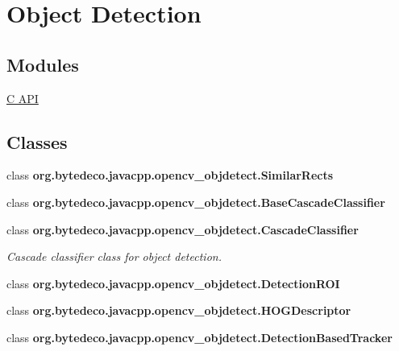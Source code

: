 \hypertarget{group__objdetect}{}\section{Object Detection}
\label{group__objdetect}
\subsection*{Modules}
\begin{DoxyCompactItemize}
\item 
\hyperlink{group__objdetect__c}{C A\+PI}
\end{DoxyCompactItemize}
\subsection*{Classes}
\begin{DoxyCompactItemize}
\item 
class {\bfseries org.\+bytedeco.\+javacpp.\+opencv\+\_\+objdetect.\+Similar\+Rects}
\item 
class {\bfseries org.\+bytedeco.\+javacpp.\+opencv\+\_\+objdetect.\+Base\+Cascade\+Classifier}
\item 
class {\bfseries org.\+bytedeco.\+javacpp.\+opencv\+\_\+objdetect.\+Cascade\+Classifier}
\begin{DoxyCompactList}\small\item\em Cascade classifier class for object detection. \end{DoxyCompactList}\item 
class {\bfseries org.\+bytedeco.\+javacpp.\+opencv\+\_\+objdetect.\+Detection\+R\+OI}
\item 
class {\bfseries org.\+bytedeco.\+javacpp.\+opencv\+\_\+objdetect.\+H\+O\+G\+Descriptor}
\item 
class {\bfseries org.\+bytedeco.\+javacpp.\+opencv\+\_\+objdetect.\+Detection\+Based\+Tracker}
\end{DoxyCompactItemize}
